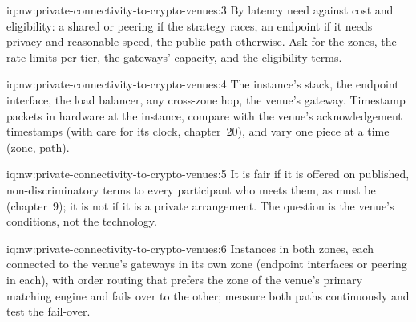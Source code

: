 \begin{solution}{iq:nw:private-connectivity-to-crypto-venues:3}
By latency need against cost and eligibility: a shared  or peering if the strategy races, an endpoint if it needs privacy and
reasonable speed, the public path otherwise. Ask for the zones, the rate limits per tier, the gateways' capacity, and the eligibility terms.
\end{solution}

\begin{solution}{iq:nw:private-connectivity-to-crypto-venues:4}
The instance's stack, the endpoint interface, the load balancer, any cross-zone hop, the venue's gateway. Timestamp packets in hardware at the
instance, compare with the venue's acknowledgement timestamps (with care for its clock, chapter~20), and vary one piece at a time (zone, path).
\end{solution}

\begin{solution}{iq:nw:private-connectivity-to-crypto-venues:5}
It is fair if it is offered on published, non-discriminatory terms to every participant who meets them, as  must be (chapter~9); it is not
if it is a private arrangement. The question is the venue's conditions, not the technology.
\end{solution}

\begin{solution}{iq:nw:private-connectivity-to-crypto-venues:6}
Instances in both zones, each connected to the venue's gateways in its own zone (endpoint interfaces or peering in each), with order routing that
prefers the zone of the venue's primary matching engine and fails over to the other; measure both paths continuously and test the fail-over.
\end{solution}
